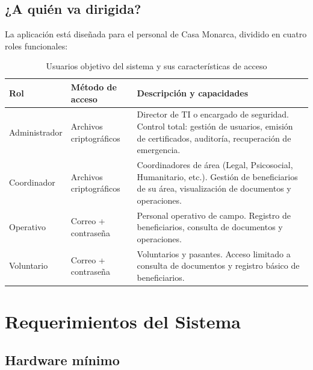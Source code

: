 \documentclass[10pt,letterpaper]{report}
\begin{document}
\section{¿A quién va dirigida?}

La aplicación está diseñada para el personal de Casa Monarca, dividido en cuatro roles funcionales:

\begin{table}[H]
  \centering
  \caption{Usuarios objetivo del sistema y sus características de acceso}
  \label{tab:usuarios-objetivo}
  \begin{tabularx}{\textwidth}{l l X}
    \toprule
    \textbf{Rol} & \textbf{Método de acceso} & \textbf{Descripción y capacidades} \\
    \midrule
    Administrador & Archivos criptográficos & Director de TI o encargado de seguridad. Control total: gestión de usuarios, emisión de certificados, auditoría, recuperación de emergencia. \\
    Coordinador   & Archivos criptográficos & Coordinadores de área (Legal, Psicosocial, Humanitario, etc.). Gestión de beneficiarios de su área, visualización de documentos y operaciones. \\
    Operativo     & Correo + contraseña     & Personal operativo de campo. Registro de beneficiarios, consulta de documentos y operaciones. \\
    Voluntario    & Correo + contraseña     & Voluntarios y pasantes. Acceso limitado a consulta de documentos y registro básico de beneficiarios. \\
    \bottomrule
  \end{tabularx}
\end{table}

\chapter{Requerimientos del Sistema}

\section{Hardware mínimo}
\end{document}
